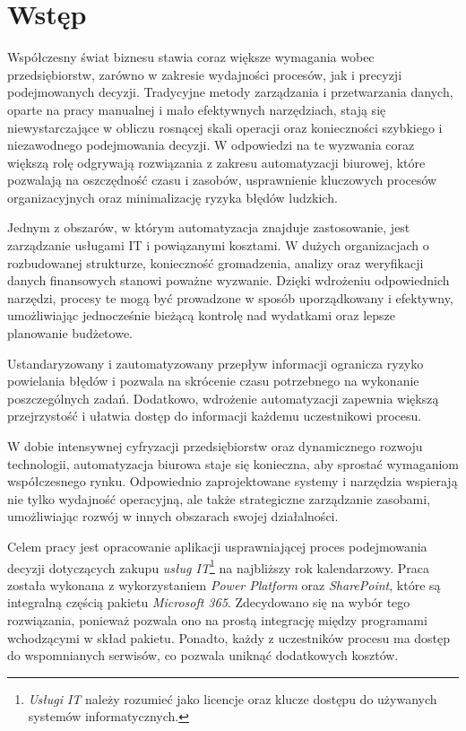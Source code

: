 \chapter{Wstęp}
Współczesny świat biznesu stawia coraz większe wymagania wobec przedsiębiorstw, zarówno w zakresie wydajności procesów, jak i precyzji podejmowanych decyzji. Tradycyjne metody zarządzania i przetwarzania danych, oparte na pracy manualnej i mało efektywnych narzędziach, stają się niewystarczające w obliczu rosnącej skali operacji oraz konieczności szybkiego i niezawodnego podejmowania decyzji. W odpowiedzi na te wyzwania coraz większą rolę odgrywają rozwiązania z zakresu automatyzacji biurowej, które pozwalają na oszczędność czasu i zasobów, usprawnienie kluczowych procesów organizacyjnych oraz minimalizację ryzyka błędów ludzkich.
\par Jednym z obszarów, w którym automatyzacja znajduje zastosowanie, jest zarządzanie usługami IT i powiązanymi kosztami. W dużych organizacjach o rozbudowanej strukturze, konieczność gromadzenia, analizy oraz weryfikacji danych finansowych stanowi poważne wyzwanie. Dzięki wdrożeniu odpowiednich narzędzi, procesy te mogą być prowadzone w sposób uporządkowany i efektywny, umożliwiając jednocześnie bieżącą kontrolę nad wydatkami oraz lepsze planowanie budżetowe.
\par   Ustandaryzowany i zautomatyzowany przepływ informacji ogranicza ryzyko powielania błędów i pozwala na skrócenie czasu potrzebnego na wykonanie poszczególnych zadań. Dodatkowo, wdrożenie automatyzacji zapewnia większą przejrzystość i ułatwia dostęp do informacji każdemu uczestnikowi procesu.
\par W dobie intensywnej cyfryzacji przedsiębiorstw oraz dynamicznego rozwoju technologii, automatyzacja biurowa staje się konieczna, aby sprostać wymaganiom współczesnego rynku. Odpowiednio zaprojektowane systemy i narzędzia wspierają nie tylko wydajność operacyjną, ale także strategiczne zarządzanie zasobami, umożliwiając rozwój w innych obszarach swojej działalności.
\vspace{1cm}
\par Celem pracy jest opracowanie aplikacji usprawniającej proces podejmowania decyzji dotyczących zakupu \emph{usług IT}\footnote{\emph{Usługi IT}  należy rozumieć jako licencje oraz klucze dostępu do używanych systemów informatycznych.} na najbliższy rok kalendarzowy. Praca została wykonana z wykorzystaniem \emph{Power Platform} oraz \emph{SharePoint}, które są integralną częścią pakietu \emph{Microsoft 365}. Zdecydowano się na wybór tego rozwiązania, ponieważ pozwala ono na prostą integrację między programami wchodzącymi w skład pakietu. Ponadto, każdy z uczestników procesu ma dostęp do wspomnianych serwisów, co pozwala uniknąć dodatkowych kosztów.



